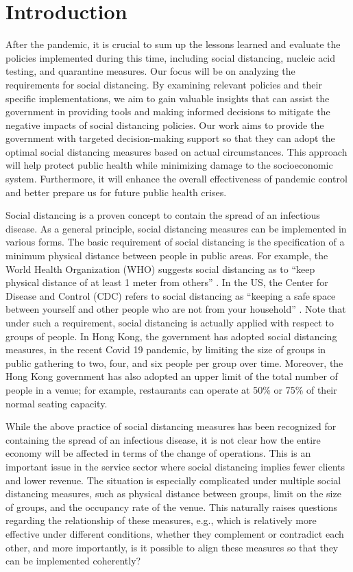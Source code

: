 \section{Introduction}
After the pandemic, it is crucial to sum up the lessons learned and evaluate the policies implemented during this time, including social distancing, nucleic acid testing, and quarantine measures. Our focus will be on analyzing the requirements for social distancing. By examining relevant policies and their specific implementations, we aim to gain valuable insights that can assist the government in providing tools and making informed decisions to mitigate the negative impacts of social distancing policies. Our work aims to provide the government with targeted decision-making support so that they can adopt the optimal social distancing measures based on actual circumstances. This approach will help protect public health while minimizing damage to the socioeconomic system. Furthermore, it will enhance the overall effectiveness of pandemic control and better prepare us for future public health crises.

Social distancing is a proven concept to contain the spread of an infectious disease. As a general principle, social distancing measures can be implemented in various forms. The basic requirement of social distancing is the specification of a minimum physical distance between people in public areas. For example, the World Health Organization (WHO) suggests social distancing as to ``keep physical distance of at least 1 meter from others'' \cite{AdviceforPublic}. In the US, the Center for Disease and Control (CDC) refers to social distancing as ``keeping a safe space between yourself and other people who are not from your household'' \cite{CDC}. 
Note that under such a requirement, social distancing is actually applied with respect to groups of people. In Hong Kong, the government has adopted social distancing measures, in the recent Covid 19 pandemic, by limiting the size of groups in public gathering to two, four, and six people per group over time. Moreover, the Hong Kong government has also adopted an upper limit of the total number of people in a venue; for example, restaurants can operate at 50\% or 75\% of their normal seating capacity.

While the above practice of social distancing measures has been recognized for containing the spread of an infectious disease,  it is not clear how the entire economy will be affected in terms of the change of operations. This is an important issue in the service sector where social distancing implies fewer clients and lower revenue. The situation is especially complicated under multiple social distancing measures, such as physical distance between groups, limit on the size of groups, and the occupancy rate of the venue. This naturally raises questions regarding the relationship of these measures, e.g., which is relatively more effective under different conditions, whether they complement or contradict each other, and more importantly, is it possible to align these measures so that they can be implemented coherently? 

